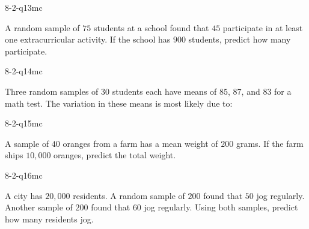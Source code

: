 \begin{practiceQuestion}{8-2-q13}{mc}
\begin{questionText}
A random sample of $75$ students at a school found that $45$ participate in at least one extracurricular activity. If the school has $900$ students, predict how many participate.
\end{questionText}
\end{practiceQuestion}

\begin{practiceQuestion}{8-2-q14}{mc}
\begin{questionText}
Three random samples of $30$ students each have means of $85$, $87$, and $83$ for a math test. The variation in these means is most likely due to:
\end{questionText}
\end{practiceQuestion}

\begin{practiceQuestion}{8-2-q15}{mc}
\begin{questionText}
A sample of $40$ oranges from a farm has a mean weight of $200$ grams. If the farm ships $10{,}000$ oranges, predict the total weight.
\end{questionText}
\end{practiceQuestion}

\begin{practiceQuestion}{8-2-q16}{mc}
\begin{questionText}
A city has $20{,}000$ residents. A random sample of $200$ found that $50$ jog regularly. Another sample of $200$ found that $60$ jog regularly. Using both samples, predict how many residents jog.
\end{questionText}
\end{practiceQuestion}

